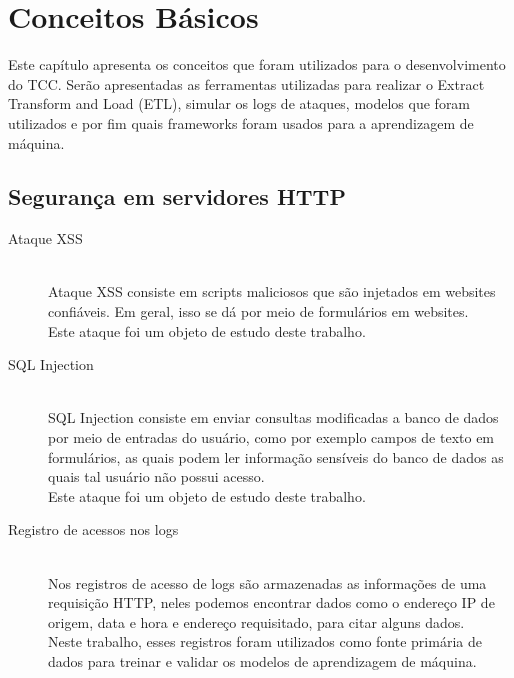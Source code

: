 
\chapter{Conceitos Básicos}
\label{cap:concepts}

Este capítulo apresenta os conceitos que foram utilizados para o desenvolvimento do TCC. Serão apresentadas
as ferramentas utilizadas para realizar o Extract Transform and Load (ETL), simular os logs de ataques, modelos
que foram utilizados e por fim quais frameworks foram usados para a aprendizagem de máquina.

\section{Segurança em servidores HTTP}

\begin{description}
    \item[Ataque XSS] \hfill \\ Ataque XSS consiste em scripts maliciosos que são injetados em 
    websites confiáveis. Em geral, isso se dá por meio de formulários em websites. \\ 
    Este ataque foi um objeto de estudo deste trabalho.
    \item[SQL Injection] \hfill \\ SQL Injection consiste em enviar consultas modificadas a banco 
    de dados por meio de entradas do usuário, como por exemplo campos de texto em formulários, as quais 
    podem ler informação sensíveis do banco de dados as quais tal usuário não possui acesso. \\
    Este ataque foi um objeto de estudo deste trabalho.
    \item[Registro de acessos nos logs] \hfill \\ Nos registros de acesso de logs são armazenadas as
    informações de uma requisição HTTP, neles podemos encontrar dados como o endereço IP de origem,
    data e hora e endereço requisitado, para citar alguns dados.  \\
    Neste trabalho, esses registros foram utilizados como fonte primária de dados para treinar 
    e validar os modelos de aprendizagem de máquina.
\end{description}

